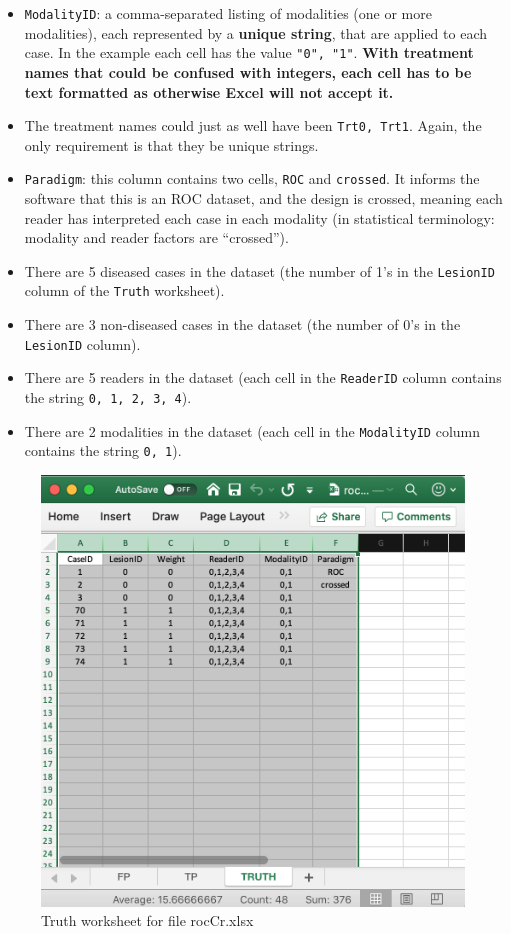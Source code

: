 \documentclass[
]{book}
\begin{document}
\begin{itemize}
\item
  \texttt{ModalityID}: a comma-separated listing of modalities (one or more modalities), each represented by a \textbf{unique string}, that are applied to each case. In the example each cell has the value \texttt{"0",\ "1"}. \textbf{With treatment names that could be confused with integers, each cell has to be text formatted as otherwise Excel will not accept it.}
\item
  The treatment names could just as well have been \texttt{Trt0,\ Trt1}. Again, the only requirement is that they be unique strings.
\item
  \texttt{Paradigm}: this column contains two cells, \texttt{ROC} and \texttt{crossed}. It informs the software that this is an ROC dataset, and the design is crossed, meaning each reader has interpreted each case in each modality (in statistical terminology: modality and reader factors are ``crossed'').
\item
  There are 5 diseased cases in the dataset (the number of 1's in the \texttt{LesionID} column of the \texttt{Truth} worksheet).
\item
  There are 3 non-diseased cases in the dataset (the number of 0's in the \texttt{LesionID} column).
\item
  There are 5 readers in the dataset (each cell in the \texttt{ReaderID} column contains the string \texttt{0,\ 1,\ 2,\ 3,\ 4}).
\item
  There are 2 modalities in the dataset (each cell in the \texttt{ModalityID} column contains the string \texttt{0,\ 1}).
\end{itemize}

\begin{figure}

{\centering \includegraphics[width=0.5\linewidth,height=0.2\textheight]{images/rocCrTruth} 

}

\caption{Truth worksheet for file rocCr.xlsx}\label{fig:showRocCrTruthSheet}
\end{figure}
\end{document}
